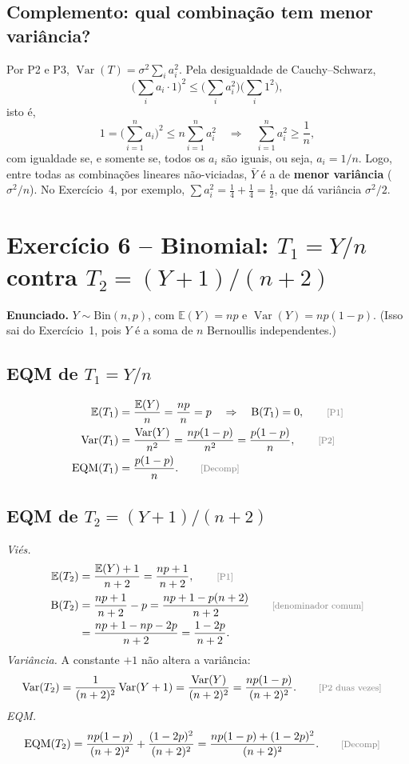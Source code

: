 \documentclass[11pt,a4paper]{article}
\newcommand{\E}{\mathbb{E}}
\newcommand{\Var}{\operatorname{Var}}
\newcommand{\EQM}{\operatorname{EQM}}
\newcommand{\B}{\operatorname{B}}
\newcommand{\bY}{\bar{Y}}
\newcommand{\just}[1]{\tag*{\footnotesize\textcolor{gray}{[#1]}}}
\begin{document}
\subsection*{Complemento: qual combinação tem menor variância?}
Por P2 e P3, $\Var(T)=\sigma^2\sum_ia_i^2$. Pela desigualdade de Cauchy--Schwarz,
\[\Big(\sum_ia_i\cdot1\Big)^2\le\Big(\sum_ia_i^2\Big)\Big(\sum_i1^2\Big),\]
isto é,
\[
1=\Big(\sum_{i=1}^na_i\Big)^2\le n\sum_{i=1}^na_i^2
\quad\Longrightarrow\quad
\sum_{i=1}^na_i^2\ge\frac1n,
\]
com igualdade se, e somente se, todos os $a_i$ são iguais, ou seja, $a_i=1/n$. Logo, entre todas as combinações lineares não-viciadas, $\bY$ é a de \textbf{menor variância} ($\sigma^2/n$). No Exercício~4, por exemplo, $\sum a_i^2=\frac14+\frac14=\frac12$, que dá variância $\sigma^2/2$.

\section{Exercício 6 -- Binomial: $T_1=Y/n$ contra $T_2=(Y+1)/(n+2)$}

\textbf{Enunciado.} $Y\sim\text{Bin}(n,p)$, com $\E(Y)=np$ e $\Var(Y)=np(1-p)$. (Isso sai do Exercício~1, pois $Y$ é a soma de $n$ Bernoullis independentes.)

\subsection*{EQM de $T_1=Y/n$}
\begin{align*}
\E(T_1)&=\frac{\E(Y)}{n}=\frac{np}{n}=p\quad\Rightarrow\quad\B(T_1)=0, \just{P1}\\
\Var(T_1)&=\frac{\Var(Y)}{n^2}=\frac{np(1-p)}{n^2}=\frac{p(1-p)}{n}, \just{P2}\\
\EQM(T_1)&=\frac{p(1-p)}{n}. \just{Decomp}
\end{align*}

\subsection*{EQM de $T_2=(Y+1)/(n+2)$}
\textit{Viés.}
\begin{align*}
\E(T_2)&=\frac{\E(Y)+1}{n+2}=\frac{np+1}{n+2}, \just{P1}\\
\B(T_2)&=\frac{np+1}{n+2}-p=\frac{np+1-p(n+2)}{n+2} \just{denominador comum}\\
&=\frac{np+1-np-2p}{n+2}=\frac{1-2p}{n+2}.
\end{align*}
\textit{Variância.} A constante $+1$ não altera a variância:
\begin{align*}
\Var(T_2)&=\frac{1}{(n+2)^2}\Var(Y+1)=\frac{\Var(Y)}{(n+2)^2}=\frac{np(1-p)}{(n+2)^2}. \just{P2 duas vezes}
\end{align*}
\textit{EQM.}
\begin{align*}
\EQM(T_2)&=\frac{np(1-p)}{(n+2)^2}+\frac{(1-2p)^2}{(n+2)^2}
=\frac{np(1-p)+(1-2p)^2}{(n+2)^2}. \just{Decomp}
\end{align*}
\end{document}
